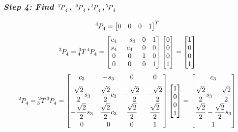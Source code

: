 \documentclass[10pt]{article}
\begin{document}
\subsubsection*{\textbf{\textit{Step 4: Find }}$\bf{\it{\tensor*[^{3}]{P}{_{4}}}}$, $\bf{\it{\tensor*[^{2}]{P}{_{4}}}}$,$\bf{\it{\tensor*[^{1}]{P}{_{4}}}}$,$\bf{\it{\tensor*[^{0}]{P}{_{4}}}}$}
\[
\tensor*[^{4}]{P}{_{4}} =
\begin{bmatrix}
   0 & 0 & 0 & 1
\end{bmatrix}^T
\]
\[
\tensor*[^{3}]{P}{_{4}} = \tensor*[^{3}_{4}]{T}{} \tensor*[^{4}]{P}{_{4}} =
\begin{bmatrix}
    c_{4}        & -s_{4}       & 0     & 1      \\
    s_{4}        & c_{4}        & 0     & 0      \\
    0            & 0            & 1     & 0      \\
    0            & 0            & 0     & 1
\end{bmatrix}
\begin{bmatrix}
   0 \\ 0 \\ 0 \\ 1
\end{bmatrix} =
\begin{bmatrix}
   1 \\ 0 \\ 0 \\ 1
\end{bmatrix}
\]
\[
\tensor*[^{2}]{P}{_{4}} = \tensor*[^{2}_{3}]{T}{} \tensor*[^{3}]{P}{_{4}} =
\begin{bmatrix}
    c_{3}                            & -s_{3}                           & 0                       & 0  \\[6pt]
    \dfrac{\sqrt{2}}{2} s_{3}        & \dfrac{\sqrt{2}}{2} c_{3}        & -\dfrac{\sqrt{2}}{2}    & -\dfrac{\sqrt{2}}{2}      \\[6pt]
    -\dfrac{\sqrt{2}}{2} s_{3}       & \dfrac{\sqrt{2}}{2} c_{3}        & \dfrac{\sqrt{2}}{2}     & \dfrac{\sqrt{2}}{2}       \\[6pt]
    0                                & 0                                & 0                       & 1
\end{bmatrix}
\begin{bmatrix}
   1 \\ 0 \\ 0 \\ 1
\end{bmatrix} =
\begin{bmatrix}
   c_{3} \\[6pt] \dfrac{\sqrt{2}}{2} s_{3} - \dfrac{\sqrt{2}}{2} \\[6pt] \dfrac{\sqrt{2}}{2} - \dfrac{\sqrt{2}}{2} s_{3} \\[6pt]  1
\end{bmatrix}
\]
\end{document}
